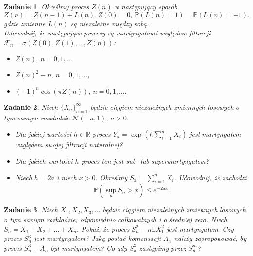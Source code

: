 \documentclass{mwart}
\newtheorem{zd}{Zadanie}
\begin{document}
\begin{zd}
	Określmy proces $Z(n)$ w następujący sposób
	\begin{displaymath}
		Z(n) = Z(n-1) + L(n), Z(0) = 0,\  \mathbb{P}(L(n) = 1)  = \mathbb{P}(L(n) = -1),
	\end{displaymath}
	gdzie zmienne $L(n)$ są niezależne między sobą.\\
	Udowodnij, że następujące procesy są martyngałami względem filtracji $\mathcal{F}_n = \sigma\left(Z(0), Z(1), \dots, Z(n)\right)$:
	\begin{itemize}
		\item $Z(n), \ n= 0, 1, \dots$
		\item $Z(n)^2 - n, \ n= 0, 1, \dots$,
		\item $ (-1)^n\cos \left(\pi Z(n)\right), \ n= 0, 1, \dots.$
	\end{itemize}
\end{zd}

\begin{zd}
Niech $\{X_n\}_{n=1}^{\infty}$ będzie ciągiem niezależnych zmiennych losowych o tym samym rozkładzie $\mathcal{N}\left(-a, 1\right),\ a >0$.
\begin{itemize}
\item Dla jakiej wartości $h\in \mathbb{R}$ proces $Y_n = \exp \left(h\sum_{i = 1}^nX_i\right)$ jest martyngałem względem swojej filtracji naturalnej?
\item Dla jakich wartości $h$ proces ten jest sub- lub supermartyngałem?
\item Niech $h=2a$ i niech $x > 0$. Określmy $S_n = \sum_{i=1}^nX_i$. Udowodnij, że zachodzi
\begin{displaymath}
\mathbb{P}\left(\sup_nS_n > x\right) \leq e^{-2ax}.
\end{displaymath}
\end{itemize}
\end{zd}

\begin{zd}
Niech $X_1, X_2, X_3, \dots$ będzie ciągiem niezależnych zmiennych losowych o tym samym rozkładzie, odpowiednio całkowalnych i o średniej zero. Niech $S_n = X_1+X_2+\dots + X_n$. Pokaż, że proces $S_n^2 - n\mathbb{E}X_1^2$  jest martyngałem. Czy proces $S_n^3$ jest martyngałem? Jaką postać komensacji $A_n$ należy zaproponować, by proces $S_n^3-A_n$ był martyngałem? Co gdy $S_n^3$ zastąpimy przez $S_n^m$?
\end{zd}
\end{document}
